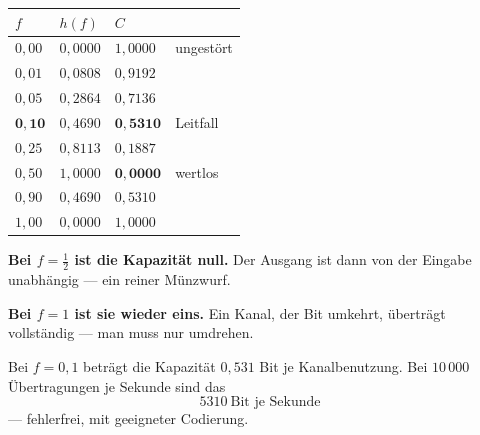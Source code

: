 \begin{merksatz}
\begin{center}
{\small
\renewcommand{\arraystretch}{1.48}
\begin{tabular}{@{}P{1.4cm}P{1.8cm}P{1.8cm}P{2.4cm}@{}}
\toprule
$f$ & $h(f)$ & $C$ & \\
\midrule
$0{,}00$ & $0{,}0000$ & $1{,}0000$ & ungestört\\
$0{,}01$ & $0{,}0808$ & $0{,}9192$ & \\
$0{,}05$ & $0{,}2864$ & $0{,}7136$ & \\
$\mathbf{0{,}10}$ & $0{,}4690$ & $\mathbf{0{,}5310}$ & \textcolor{akzent}{Leitfall}\\
$0{,}25$ & $0{,}8113$ & $0{,}1887$ & \\
$0{,}50$ & $1{,}0000$ & $\mathbf{0{,}0000}$ & \textcolor{akzent}{wertlos}\\
$0{,}90$ & $0{,}4690$ & $0{,}5310$ & \\
$1{,}00$ & $0{,}0000$ & $1{,}0000$ & \\
\bottomrule
\end{tabular}}
\end{center}

\begin{center}
\begin{minipage}{0.9\textwidth}
\textbf{Bei $f=\frac12$ ist die Kapazität null.} Der Ausgang ist dann von der Eingabe unabhängig --- ein reiner Münzwurf.
\end{minipage}
\end{center}

\begin{center}
\begin{minipage}{0.9\textwidth}
\textbf{Bei $f=1$ ist sie wieder eins.} Ein Kanal, der  Bit umkehrt, überträgt vollständig --- man muss nur umdrehen.
\end{minipage}
\end{center}

\begin{center}
\begin{minipage}{0.88\textwidth}
\end{minipage}
\end{center}

Bei $f=0{,}1$ beträgt die Kapazität $0{,}531$ Bit je Kanalbenutzung. Bei $10\,000$ Übertragungen je Sekunde sind das
\[ 5310 \ \text{Bit je Sekunde} \]
--- fehlerfrei, mit geeigneter Codierung.
\end{merksatz}

